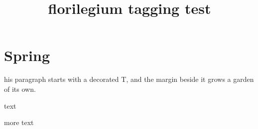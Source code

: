 \documentclass{article}
\title{florilegium tagging test}
\begin{document}
\section{Spring}
his paragraph starts with a decorated T, and the margin beside
it grows a garden of its own.
\florilegiumtextend

\clearpage

text 

more text 
\end{document}
